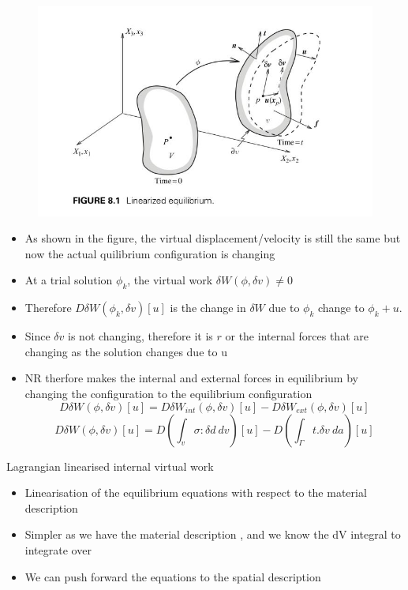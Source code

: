 	\begin{frame}
		\begin{figure}
			\centering
			\includegraphics[width=0.5\linewidth]{Figure/fig11}
		\end{figure}
		\begin{itemize}
			\item As shown in the figure, the virtual displacement/velocity is still the same but now the actual quilibrium configuration is changing
			\item At a trial solution $\phi_k$, the virtual work $\delta W(\phi,\delta v) \neq 0$
			
			\item Therefore $D\delta W(\phi_k,\delta v)[u]$ is the change in $ \delta W$ due to $\phi_k$ change to $\phi_k + u$. 
			
			\item Since $\delta v $ is not changing, therefore it is $r$ or the internal forces that are changing as the solution changes due to u
			
			\item NR therfore makes the internal and external forces in equilibrium by changing the configuration to the equilibrium configuration
			\begin{equation}
				D\delta W(\phi, \delta v)[u] = D\delta W_{int}(\phi,\delta v)[u] - D \delta W_{ext}(\phi,\delta v)[u]
			\end{equation}
			\begin{equation}
			D\delta W(\phi, \delta v)[u] = D \left(\int_v \sigma : \delta d~ dv  \right)[u] - D \left( \int_{\Gamma} t.\delta v ~da \right)[u]
			\end{equation}			
		\end{itemize}
	\end{frame}


	\begin{frame}{Lagrangian linearised internal virtual work}
		\begin{itemize}
			\item Linearisation of the equilibrium equations with respect to the material description
			\item Simpler as we have the material description , and we know the dV integral to integrate over
			\item We can push forward the equations to the spatial description
			
			
		\end{itemize}
	\end{frame}

